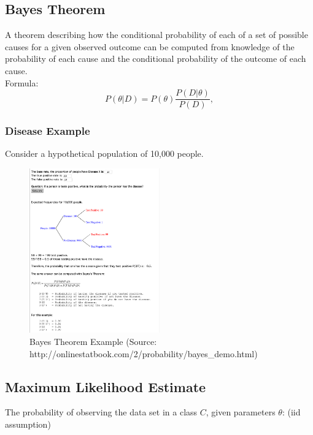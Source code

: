 \subsection{Bayes Theorem} A theorem describing how the conditional probability of each of a set of possible causes for a given observed outcome can be computed from knowledge of the probability of each cause and the conditional probability of the outcome of each cause.\\

Formula: 
\begin{equation}
P(\theta|{D}) = P(\theta ) \frac{P({D} |\theta)}{P({D})},
\end{equation}

\subsubsection{Disease Example}
Consider a hypothetical population of 10,000 people.

\begin{figure}[H]
  \begin{center}
    \includegraphics[width=0.5\textwidth]{disease_eg.png}
    \caption{
      Bayes Theorem Example (Source: http://onlinestatbook.com/2/probability/bayes\_demo.html)}
  \end{center}
\end{figure}

\subsection{Maximum Likelihood Estimate}
The probability of observing the data set in a class $C$, given parameters \(\theta\): (iid assumption)

